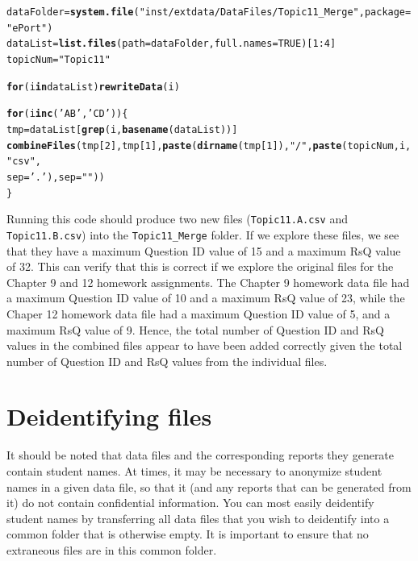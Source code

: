 \documentclass[11pt,a4paper,oldfontcommands,openany]{memoir}
\makeatletter
\newcommand{\hlnum}[1]{\textcolor[rgb]{0.686,0.059,0.569}{#1}}%
\newcommand{\hlstr}[1]{\textcolor[rgb]{0.192,0.494,0.8}{#1}}%
\newcommand{\hlopt}[1]{\textcolor[rgb]{0,0,0}{#1}}%
\newcommand{\hlstd}[1]{\textcolor[rgb]{0.345,0.345,0.345}{#1}}%
\newcommand{\hlkwa}[1]{\textcolor[rgb]{0.161,0.373,0.58}{\textbf{#1}}}%
\newcommand{\hlkwb}[1]{\textcolor[rgb]{0.69,0.353,0.396}{#1}}%
\newcommand{\hlkwc}[1]{\textcolor[rgb]{0.333,0.667,0.333}{#1}}%
\newcommand{\hlkwd}[1]{\textcolor[rgb]{0.737,0.353,0.396}{\textbf{#1}}}%
\newenvironment{kframe}{%
 \def\at@end@of@kframe{}%
 \ifinner\ifhmode%
  \def\at@end@of@kframe{\end{minipage}}%
  \begin{minipage}{\columnwidth}%
 \fi\fi%
 \def\FrameCommand##1{\hskip\@totalleftmargin \hskip-\fboxsep
 \colorbox{shadecolor}{##1}\hskip-\fboxsep
     \hskip-\linewidth \hskip-\@totalleftmargin \hskip\columnwidth}%
 \MakeFramed {\advance\hsize-\width
   \@totalleftmargin\z@ \linewidth\hsize
   \@setminipage}}%
 {\par\unskip\endMakeFramed%
 \at@end@of@kframe}
\newenvironment{knitrout}{}{} %
\numberwithin{equation}{section} %
\makeatother
\begin{document}
\begin{knitrout}
\color{fgcolor}\begin{kframe}
\begin{alltt}
\hlstd{dataFolder} \hlkwb{=} \hlkwd{system.file}\hlstd{(}\hlstr{"inst/extdata/DataFiles/Topic11_Merge"}\hlstd{,} \hlkwc{package}\hlstd{=}\hlstr{"ePort"}\hlstd{)}
\hlstd{dataList} \hlkwb{=} \hlkwd{list.files}\hlstd{(}\hlkwc{path} \hlstd{= dataFolder,} \hlkwc{full.names}\hlstd{=}\hlnum{TRUE}\hlstd{)[}\hlnum{1}\hlopt{:}\hlnum{4}\hlstd{]}
\hlstd{topicNum} \hlkwb{=} \hlstr{"Topic11"}

\hlkwa{for} \hlstd{(i} \hlkwa{in} \hlstd{dataList)} \hlkwd{rewriteData}\hlstd{(i)}

\hlkwa{for}\hlstd{(i} \hlkwa{in} \hlkwd{c}\hlstd{(}\hlstr{'AB'}\hlstd{,} \hlstr{'CD'}\hlstd{))\{}
  \hlstd{tmp} \hlkwb{=} \hlstd{dataList[}\hlkwd{grep}\hlstd{(i,} \hlkwd{basename}\hlstd{(dataList))]}
  \hlkwd{combineFiles}\hlstd{(tmp[}\hlnum{2}\hlstd{], tmp[}\hlnum{1}\hlstd{],} \hlkwd{paste}\hlstd{(}\hlkwd{dirname}\hlstd{(tmp[}\hlnum{1}\hlstd{]),} \hlstr{"/"}\hlstd{,} \hlkwd{paste}\hlstd{(topicNum, i,} \hlstr{"csv"}\hlstd{,}
    \hlkwc{sep} \hlstd{=} \hlstr{'.'}\hlstd{),} \hlkwc{sep} \hlstd{=} \hlstr{""}\hlstd{))}
\hlstd{\}}
\end{alltt}
\end{kframe}
\end{knitrout}

Running this code should produce two new files (\texttt{Topic11.A.csv} and \texttt{Topic11.B.csv}) into the \texttt{Topic11\_Merge} folder. If we explore these files, we see that they have a maximum Question ID value of 15 and a maximum RsQ value of 32. This can verify that this is correct if we explore the original files for the Chapter 9 and 12 homework assignments. The Chapter 9 homework data file had a maximum Question ID value of 10 and a maximum RsQ value of 23, while the Chaper 12 homework data file had a maximum Question ID value of 5, and a maximum RsQ value of 9. Hence, the total number of Question ID and RsQ values in the combined files appear to have been added correctly given the total number of Question ID and RsQ values from the individual files.

\section{Deidentifying files}

It should be noted that data files and the corresponding reports they generate contain student names. At times, it may be necessary to anonymize student names in a given data file, so that it (and any reports that can be generated from it) do not contain confidential information. You can most easily deidentify student names by transferring all data files that you wish to deidentify into a common folder that is otherwise empty. It is important to ensure that no extraneous files are in this common folder.
\end{document}
